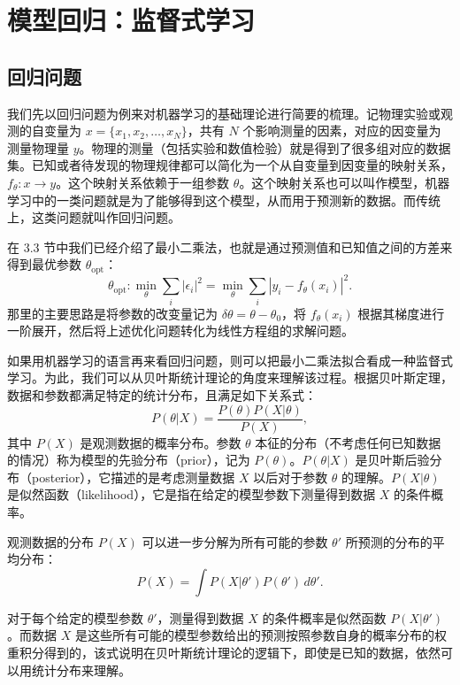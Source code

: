\section{模型回归：监督式学习}

\subsection{回归问题}
我们先以回归问题为例来对机器学习的基础理论进行简要的梳理。记物理实验或观测的自变量为 $x=\{x_1,x_2,\ldots,x_N\}$，共有 $N$ 个影响测量的因素，对应的因变量为测量物理量 $y$。物理的测量（包括实验和数值检验）就是得到了很多组对应的数据集。已知或者待发现的物理规律都可以简化为一个从自变量到因变量的映射关系，$f_\theta:x\to y$。这个映射关系依赖于一组参数 $\theta$。这个映射关系也可以叫作模型，机器学习中的一类问题就是为了能够得到这个模型，从而用于预测新的数据。而传统上，这类问题就叫作回归问题。

在 3.3 节中我们已经介绍了最小二乘法，也就是通过预测值和已知值之间的方差来得到最优参数 $\theta_{\mathrm{opt}}$：
\begin{equation}
\theta_{\mathrm{opt}}:\min_\theta\sum_i|\epsilon_i|^2
=\min_\theta\sum_i|y_i-f_\theta(x_i)|^2.
\tag{8.1.1}
\end{equation}
那里的主要思路是将参数的改变量记为 $\delta\theta=\theta-\theta_0$，将 $f_\theta(x_i)$ 根据其梯度进行一阶展开，然后将上述优化问题转化为线性方程组的求解问题。

如果用机器学习的语言再来看回归问题，则可以把最小二乘法拟合看成一种监督式学习。为此，我们可以从贝叶斯统计理论的角度来理解该过程。根据贝叶斯定理，数据和参数都满足特定的统计分布，且满足如下关系式：
\begin{equation}
P(\theta|X)=\frac{P(\theta)P(X|\theta)}{P(X)},
\tag{8.1.2}
\end{equation}
其中 $P(X)$ 是观测数据的概率分布。参数 $\theta$ 本征的分布（不考虑任何已知数据的情况）称为模型的先验分布（prior），记为 $P(\theta)$。$P(\theta|X)$ 是贝叶斯后验分布（posterior），它描述的是考虑测量数据 $X$ 以后对于参数 $\theta$ 的理解。$P(X|\theta)$ 是似然函数（likelihood），它是指在给定的模型参数下测量得到数据 $X$ 的条件概率。

观测数据的分布 $P(X)$ 可以进一步分解为所有可能的参数 $\theta'$ 所预测的分布的平均分布：
\begin{equation}
P(X)=\int P(X|\theta')P(\theta')\,d\theta'.
\tag{8.1.3}
\end{equation}

对于每个给定的模型参数 $\theta'$，测量得到数据 $X$ 的条件概率是似然函数 $P(X|\theta')$。而数据 $X$ 是这些所有可能的模型参数给出的预测按照参数自身的概率分布的权重积分得到的，该式说明在贝叶斯统计理论的逻辑下，即使是已知的数据，依然可以用统计分布来理解。

